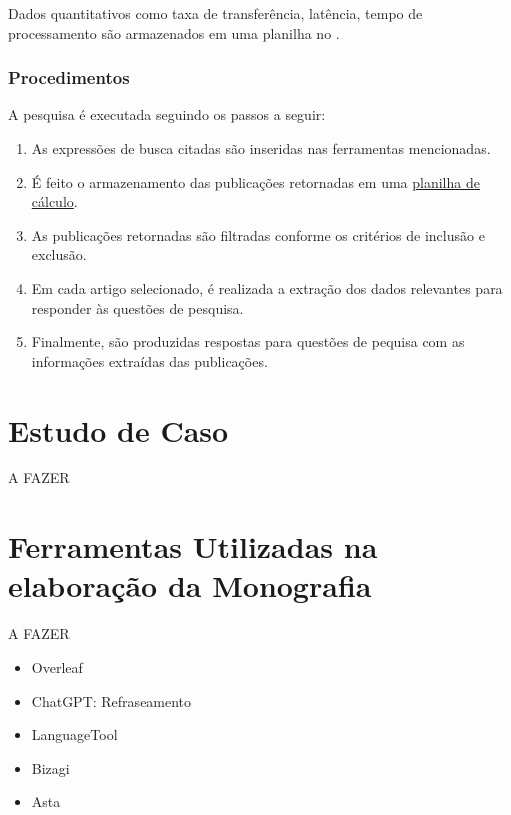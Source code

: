Dados quantitativos como taxa de transferência, latência, tempo de processamento são armazenados em uma planilha no . 

\subsubsection{Procedimentos}
A pesquisa é executada seguindo os passos a seguir:
\begin{enumerate}
    \item As expressões de busca citadas são inseridas nas ferramentas mencionadas.
    \item É feito o armazenamento das publicações retornadas em uma \href{https://docs.google.com/spreadsheets/d/1rtH8Jl1EHguqZ4Py2mgV3pab7IQzt72-Sv2S1jPzLsQ/edit?usp=sharing}{planilha de cálculo}.
    \item As publicações retornadas são filtradas conforme os critérios de inclusão e exclusão.
    \item Em cada artigo selecionado, é realizada a extração dos dados relevantes para responder às questões de pesquisa.
    \item Finalmente, são produzidas respostas para questões de pequisa com as informações extraídas das publicações.
\end{enumerate}

\section{Estudo de Caso}
A FAZER

\section{Ferramentas Utilizadas na elaboração da Monografia}
A FAZER
\begin{itemize}
    \item Overleaf
    \item ChatGPT: Refraseamento
    \item LanguageTool
    \item Bizagi
    \item Asta
\end{itemize}